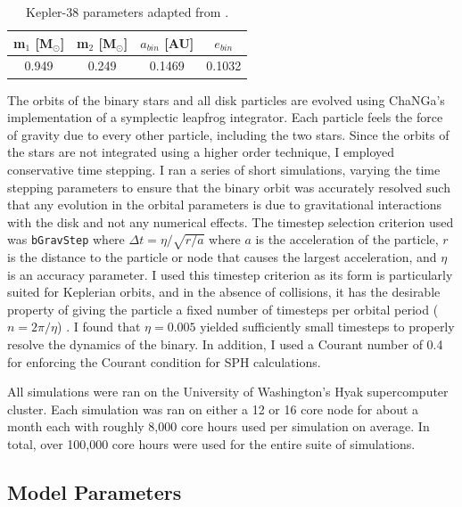 \begin{table}
	\centering
	\caption{Kepler-38 parameters adapted from \citet{Orosz2012}.}
	\begin{tabular}{cccc} %
		\hline
		m$_1$ [M$_{\odot}$] & m$_2$ [M$_{\odot}$] & $a_{bin}$ [AU] & $e_{bin}$\\
		\hline
		0.949 & 0.249 & 0.1469 & 0.1032\\
		\hline
	\end{tabular}
	\label{tab:CBDisk_table_1}
\end{table}

The orbits of the binary stars and all disk particles are evolved using ChaNGa's implementation of a 
symplectic leapfrog integrator.  Each particle feels the force of gravity due to every other particle, including
the two stars.  Since the orbits of the stars are not integrated using a higher order technique, I employed conservative
time stepping.  I ran a series of short simulations, varying the time stepping parameters to 
ensure that the binary orbit was accurately resolved such that any evolution in the orbital parameters is due to 
gravitational interactions with the disk and not any numerical
effects.  The timestep selection criterion used was {\tt bGravStep} where  
$\Delta t = \eta/\sqrt{r/a}$ where $a$ is the acceleration of the
particle, $r$ is the distance to the particle or node that causes the largest
acceleration, and $\eta$ is an accuracy parameter.  I used this timestep criterion as its form is particularly suited for Keplerian orbits, and in the absence of collisions, it has the desirable property of giving the particle a fixed number of timesteps per orbital period ($n = 2\pi/ \eta$) \citep{Richardson2000}.  I found that 
$\eta = 0.005$ yielded sufficiently small timesteps to properly
resolve the dynamics of the binary.  In addition, I used a Courant number of
0.4 for enforcing the Courant condition for SPH calculations.

All simulations were ran on the University of Washington's Hyak supercomputer cluster.  Each simulation was ran on either a 12 or 16 core node for about a month each with roughly 8,000 core hours used per simulation on average.  In total, over 100,000 core hours were used for the entire suite of simulations.

\subsection{Model Parameters}

